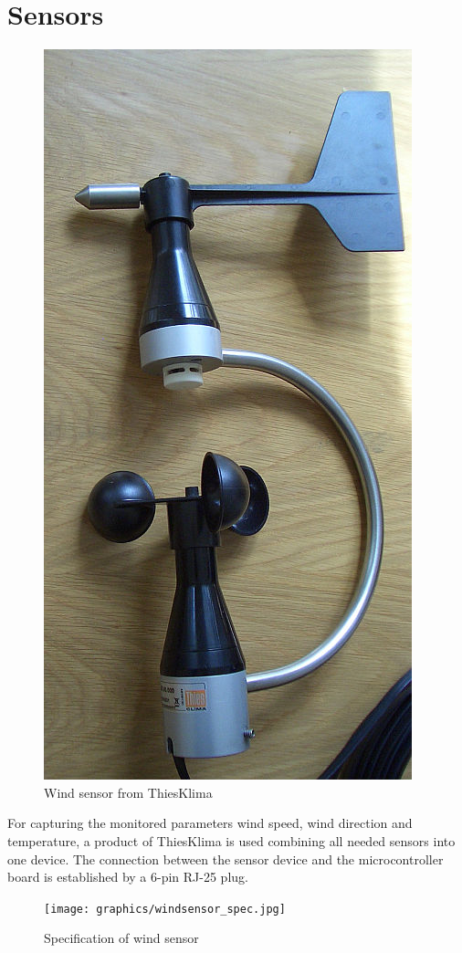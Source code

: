 
\chapter{Sensors}

\begin{figure}[ht]
    \centering
    \includegraphics[width=0.6\linewidth]{graphics/windsensor.jpg}
    \caption{Wind sensor from ThiesKlima}
    \label{fig:windsensor}
\end{figure}

For capturing the monitored parameters wind speed, wind direction and temperature, a product of ThiesKlima is used combining all needed sensors into one device. The connection between the sensor device and the microcontroller board is established by a 6-pin RJ-25 plug.

\begin{figure}[ht]
    \centering
    \texttt{[image: graphics/windsensor\_spec.jpg]}
    \caption{Specification of wind sensor}
    \label{fig:windsensor_spec}
\end{figure}

